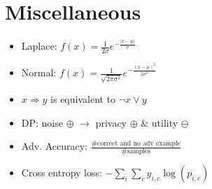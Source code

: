 \section{Miscellaneous}
\begin{itemize}
  \item Laplace: $f(x)=\frac{1}{2\sigma}e^{-\frac{|x-\mu|}{\sigma}}$
  \item Normal: $f(x)=\frac{1}{\sqrt{2\pi\sigma^2}}e^{-\frac{(x-\mu)^2}{2\sigma^2}}$
  \item $x\Rightarrow y$ is equivalent to $\neg x \lor y$
  \item DP: noise $\oplus$ $\rightarrow$ privacy $\oplus$ \& utility $\ominus$
  \item Adv. Accuracy: $\frac{\#\text{correct and no adv example}}{\#\text{samples}}$
  \item Cross entropy loss: $-\sum_i\sum_c y_{i,c}\log(p_{i,c})$
\end{itemize}
